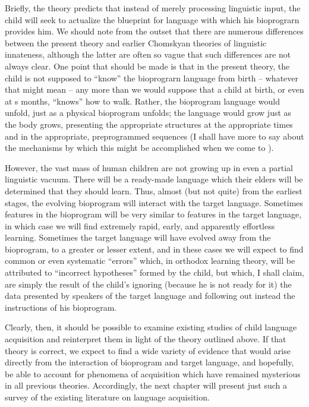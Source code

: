 Briefly, the theory predicts that instead of merely processing linguistic input, the child will seek to actualize the blueprint for language with which his bioprograrn provides him. We should note from the outset that there are numerous differences between the present theory and earlier Chomskyan theories of linguistic innateness, although the latter are often so vague that such differences are not always clear. One point that should be made is that in the present theory, the child is not supposed to ``know'' the bioprograrn language from birth -- whatever that might mean -- any more than we would suppose that a child at birth, or even at s months, ``knows'' how to walk.
Rather, the bioprogram language would unfold, just as a physical bioprogram unfolds; the language would grow just as the body grows, presenting the appropriate structures at the appropriate times and in the appropriate, preprogrammed sequences (I shall have more to say about the mechanisms by which this might be accomplished when we come to ).

However, the vast mass of human children are not growing up in even a partial linguistic vacuum. There will be a ready-made language which their elders will be determined that they should learn. Thus, almost (but not quite) from the earliest stages, the evolving bioprogram will interact with the target language. Sometimes features in the bioprogram will be very similar to features in the target language, in which case we will find extremely rapid, early, and apparently effortless learning. Sometimes the target language will have evolved away from the bioprogram, to a greater or lesser extent, and in these cases we will expect to find common or even systematic ``errors'' which, in orthodox learning theory, will be attributed to ``incorrect hypotheses'' formed by the child, but which, I shall claim, are simply the result of the child's ignoring (because he is not ready for it) the data presented by speakers of the target language and following out instead the instructions of his bioprogram.
 
Clearly, then, it should be possible to examine existing studies of child language acquisition and reinterpret them in light of the theory outlined above. If that theory is correct, we expect to find a wide variety of evidence that would arise directly from the interaction of bioprogram and target language, and hopefully, be able to account for phenomena of acquisition which have remained mysterious in all previous theories. Accordingly, the next chapter will present just such a survey of the existing literature on language acquisition.